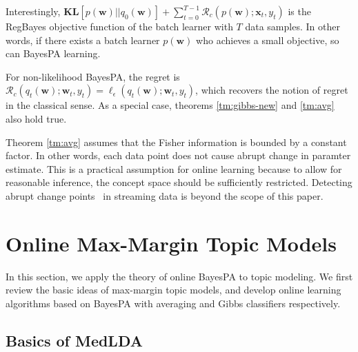 \documentclass[twoside,11pt]{article}
\newcommand{\xv}{\bm{x}}
\newcommand{\regret}{\mathcal{R}}
\newcommand{\wv}{\bm{w}}
\newcommand{\KL}{\textbf{KL}}
\begin{document}
{%
\begin{remark}
Interestingly, $\KL[p(\wv) || q_0(\wv)] + \sum_{t=0}^{T-1} \regret_c(p(\wv); \xv_t, y_t)$ is the RegBayes objective function of the batch learner with $T$ data samples. In other words, if there exists a batch learner $p(\wv)$ who achieves a small objective, so can BayesPA learning.
\end{remark}
\begin{remark}
For non-likelihood BayesPA, the regret is $ \allowbreak \regret_c(q_t(\wv); \wv_t, y_t) = \ell_\epsilon(q_t(\wv); \wv_t, y_t)$, which recovers the notion of regret in the classical sense. As a special case, theorems \ref{tm:gibbs-new} and \ref{tm:avg} also hold true.
\end{remark}

\begin{remark}
Theorem \ref{tm:avg} assumes that the Fisher information is bounded by a constant factor. In other words, each data point does not cause abrupt change in paramter estimate. This is a practical assumption for online learning because to allow for reasonable inference, the concept space should be sufficiently restricted. Detecting abrupt change points~\citep{adams2007bayesian} in streaming data is beyond the scope of this paper.
\end{remark}
}

\section{Online Max-Margin Topic Models}\label{sec:pamedlda}

In this section, we apply the theory of online BayesPA to topic modeling. We first review the basic ideas of max-margin topic models, and develop online learning algorithms based on BayesPA with averaging and Gibbs classifiers respectively.

\subsection{Basics of MedLDA}
\end{document}
